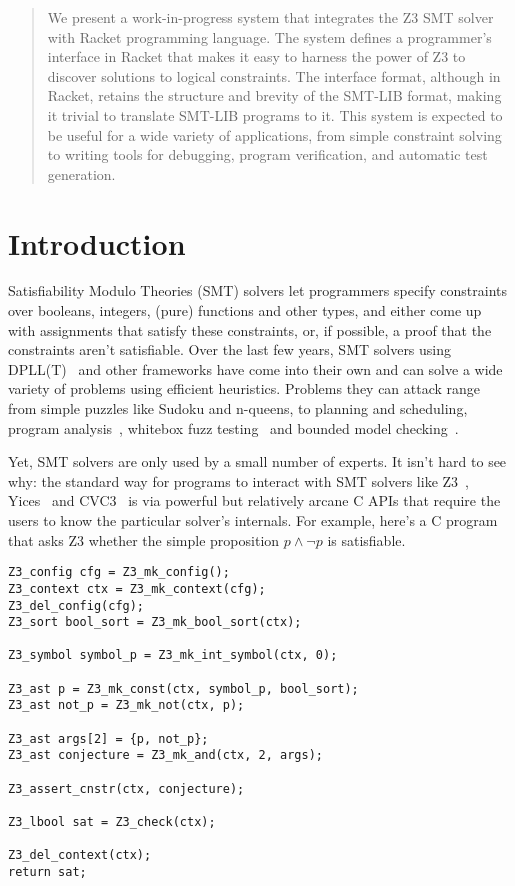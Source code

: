 \begin{abstract}
 We present a work-in-progress system that integrates the Z3 SMT solver with
 Racket programming language. The system defines a programmer's interface in
 Racket that makes it easy to harness the power of Z3 to discover solutions to
 logical constraints. The interface format, although in Racket, retains the
 structure and brevity of the SMT-LIB format, making it trivial to translate
 SMT-LIB programs to it. This system is expected to be useful for a wide variety
 of applications, from simple constraint solving to writing tools for debugging,
 program verification, and automatic test generation.
\end{abstract}

\section{Introduction}
\label{sec:motiv}

Satisfiability Modulo Theories (SMT) solvers let programmers specify constraints
over booleans, integers, (pure) functions and other types, and either come up
with assignments that satisfy these constraints, or, if possible, a proof that
the constraints aren't satisfiable. Over the last few years, SMT solvers using
DPLL(T)~\cite{dpllt:04} and other frameworks have come into their own and can
solve a wide variety of problems using efficient heuristics. Problems they can
attack range from simple puzzles like Sudoku and n-queens, to planning and
scheduling, program analysis~\cite{Gulwani:08}, whitebox fuzz
testing~\cite{Godefroid:08} and bounded model checking~\cite{Armando:09}.

Yet, SMT solvers are only used by a small number of experts. It isn't hard to
see why: the standard way for programs to interact with SMT solvers like
Z3~\cite{z3}, Yices~\cite{yices} and CVC3~\cite{cvc3} is via powerful but
relatively arcane C APIs that require the users to know the particular solver's
internals. For example, here's a C program that asks Z3 whether the simple
proposition $p \wedge \neg p$ is satisfiable.

\begin{verbatim}
Z3_config cfg = Z3_mk_config();
Z3_context ctx = Z3_mk_context(cfg);
Z3_del_config(cfg);
Z3_sort bool_sort = Z3_mk_bool_sort(ctx);

Z3_symbol symbol_p = Z3_mk_int_symbol(ctx, 0);

Z3_ast p = Z3_mk_const(ctx, symbol_p, bool_sort);
Z3_ast not_p = Z3_mk_not(ctx, p);

Z3_ast args[2] = {p, not_p};
Z3_ast conjecture = Z3_mk_and(ctx, 2, args);

Z3_assert_cnstr(ctx, conjecture);

Z3_lbool sat = Z3_check(ctx);

Z3_del_context(ctx);
return sat;
\end{verbatim}

